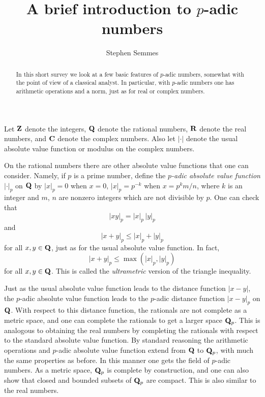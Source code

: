 \documentclass[12pt,leqno,draft]{article}
\begin{document}
\title{A brief introduction to $p$-adic numbers}



\author{Stephen Semmes}

\date{}

\maketitle


\begin{abstract}
In this short survey we look at a few basic features of $p$-adic
numbers, somewhat with the point of view of a classical analyst.
In particular, with $p$-adic numbers one has arithmetic operations
and a norm, just as for real or complex numbers.
\end{abstract}




	Let ${\bf Z}$ denote the integers, ${\bf Q}$ denote the
rational numbers, ${\bf R}$ denote the real numbers, and ${\bf C}$
denote the complex numbers.  Also let $|\cdot |$ denote the usual
absolute value function or modulus on the complex numbers.

	On the rational numbers there are other absolute value functions
that one can consider.  Namely, if $p$ is a prime number, define the
\emph{$p$-adic absolute value function} $|\cdot |_p$ on ${\bf Q}$ by
$|x|_p = 0$ when $x = 0$, $|x|_p = p^{-k}$ when $x = p^k m/n$, where
$k$ is an integer and $m$, $n$ are nonzero integers which are not
divisible by $p$.  One can check that
\begin{equation}
	|x y|_p = |x|_p \, |y|_p
\end{equation}
and
\begin{equation}
	|x + y|_p \le |x|_p + |y|_p
\end{equation}
for all $x, y \in {\bf Q}$, just as for the usual absolute value function.
In fact, 
\begin{equation}
	|x + y|_p \le \max(|x|_p, |y|_p)
\end{equation}
for all $x, y \in {\bf Q}$.  This is called the \emph{ultrametric}
version of the triangle inequality.

	Just as the usual absolute value function leads to the
distance function $|x - y|$, the $p$-adic absolute value function
leads to the $p$-adic distance function $|x - y|_p$ on ${\bf Q}$.
With respect to this distance function, the rationals are not complete
as a metric space, and one can complete the rationals to get a larger
space ${\bf Q}_p$.  This is analogous to obtaining the real numbers by
completing the rationals with respect to the standard absolute value
function.  By standard reasoning the arithmetic operations and
$p$-adic absolute value function extend from ${\bf Q}$ to ${\bf Q}_p$,
with much the same properties as before.  In this manner one gets the
field of $p$-adic numbers.  As a metric space, ${\bf Q}_p$ is complete
by construction, and one can also show that closed and bounded subsets
of ${\bf Q}_p$ are compact.  This is also similar to the real numbers.
\end{document}
